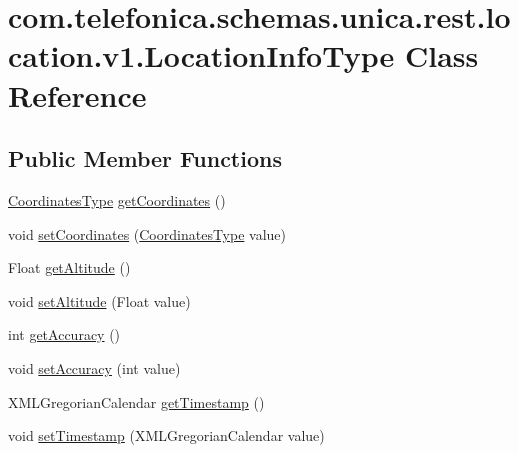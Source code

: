 \hypertarget{classcom_1_1telefonica_1_1schemas_1_1unica_1_1rest_1_1location_1_1v1_1_1LocationInfoType}{
\section{com.telefonica.schemas.unica.rest.location.v1.LocationInfoType Class Reference}
\label{classcom_1_1telefonica_1_1schemas_1_1unica_1_1rest_1_1location_1_1v1_1_1LocationInfoType}
}
\subsection*{Public Member Functions}
\begin{DoxyCompactItemize}
\item 
\hyperlink{classcom_1_1telefonica_1_1schemas_1_1unica_1_1rest_1_1location_1_1v1_1_1CoordinatesType}{CoordinatesType} \hyperlink{classcom_1_1telefonica_1_1schemas_1_1unica_1_1rest_1_1location_1_1v1_1_1LocationInfoType_a8f7577699679abb75a3cca9c8cd0bf41}{getCoordinates} ()
\item 
void \hyperlink{classcom_1_1telefonica_1_1schemas_1_1unica_1_1rest_1_1location_1_1v1_1_1LocationInfoType_a000212a59c9aca1a3f0d3628ce5e13b9}{setCoordinates} (\hyperlink{classcom_1_1telefonica_1_1schemas_1_1unica_1_1rest_1_1location_1_1v1_1_1CoordinatesType}{CoordinatesType} value)
\item 
Float \hyperlink{classcom_1_1telefonica_1_1schemas_1_1unica_1_1rest_1_1location_1_1v1_1_1LocationInfoType_a5c2785c53f43dce8dc66245ca8e57595}{getAltitude} ()
\item 
void \hyperlink{classcom_1_1telefonica_1_1schemas_1_1unica_1_1rest_1_1location_1_1v1_1_1LocationInfoType_a345f279296dbf4b8fa14f1fc9b086e1e}{setAltitude} (Float value)
\item 
int \hyperlink{classcom_1_1telefonica_1_1schemas_1_1unica_1_1rest_1_1location_1_1v1_1_1LocationInfoType_a6d839a94865e01922819a85b904011a2}{getAccuracy} ()
\item 
void \hyperlink{classcom_1_1telefonica_1_1schemas_1_1unica_1_1rest_1_1location_1_1v1_1_1LocationInfoType_a3bb5a35c2f8603070f1e347b9acf49ee}{setAccuracy} (int value)
\item 
XMLGregorianCalendar \hyperlink{classcom_1_1telefonica_1_1schemas_1_1unica_1_1rest_1_1location_1_1v1_1_1LocationInfoType_a25282785b8cc0d48a73243aced258000}{getTimestamp} ()
\item 
void \hyperlink{classcom_1_1telefonica_1_1schemas_1_1unica_1_1rest_1_1location_1_1v1_1_1LocationInfoType_a08aa648b29fd4b2ce8933d614f706409}{setTimestamp} (XMLGregorianCalendar value)
\end{DoxyCompactItemize}
